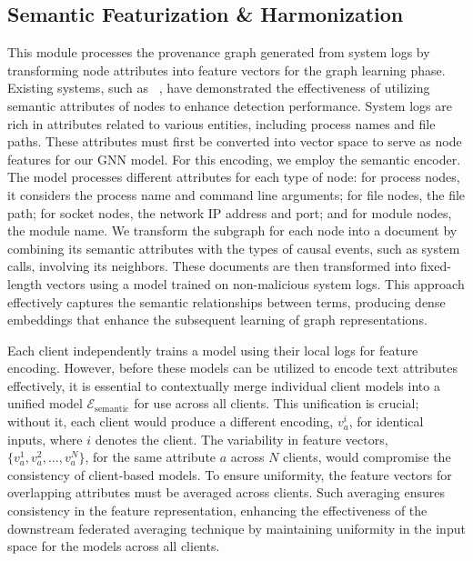 \subsection{Semantic Featurization \& Harmonization}
\label{semanfeat}

This module processes the provenance graph generated from system logs by transforming node attributes into feature vectors for the graph learning phase. Existing systems, such as \flash~\cite{flash2024}, have demonstrated the effectiveness of utilizing semantic attributes of nodes to enhance detection performance. System logs are rich in attributes related to various entities, including process names and file paths. These attributes must first be converted into vector space to serve as node features for our GNN model. For this encoding, we employ the \wordvec semantic encoder. The \wordvec model processes different attributes for each type of node: for process nodes, it considers the process name and command line arguments; for file nodes, the file path; for socket nodes, the network IP address and port; and for module nodes, the module name. We transform the subgraph for each node into a document by combining its semantic attributes with the types of causal events, such as system calls, involving its neighbors. These documents are then transformed into fixed-length vectors using a \wordvec model trained on non-malicious system logs. This approach effectively captures the semantic relationships between terms, producing dense embeddings that enhance the subsequent learning of graph representations.

 Each client independently trains a \wordvec model using their local logs for feature encoding. However, before these models can be utilized to encode text attributes effectively, it is essential to contextually merge individual client \wordvec models into a unified model \( \mathcal{E}_{\text{semantic}} \) for use across all clients. This unification is crucial; without it, each client would produce a different encoding, \(v_a^i\), for identical inputs, where \(i\) denotes the client. The variability in feature vectors, \(\{v_a^1, v_a^2, \ldots, v_a^N\}\), for the same attribute \(a\) across \(N\) clients, would compromise the consistency of client-based \gnnshort models. To ensure uniformity, the feature vectors for overlapping attributes must be averaged across clients. Such averaging ensures consistency in the feature representation, enhancing the effectiveness of the downstream federated averaging technique by maintaining uniformity in the input space for the \gnnshort models across all clients.

